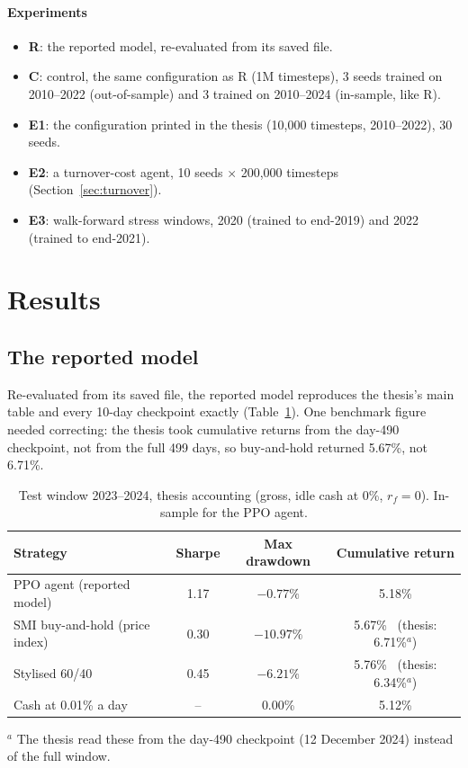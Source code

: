 \documentclass[11pt,a4paper]{article}
\begin{document}
\paragraph{Experiments}
\begin{itemize}[leftmargin=1.4em]
  \item \textbf{R}: the reported model, re-evaluated from its saved file.
  \item \textbf{C}: control, the same configuration as R (1M timesteps), 3 seeds trained on 2010--2022 (out-of-sample) and 3 trained on 2010--2024 (in-sample, like R).
  \item \textbf{E1}: the configuration printed in the thesis (10,000 timesteps, 2010--2022), 30 seeds.
  \item \textbf{E2}: a turnover-cost agent, 10 seeds $\times$ 200,000 timesteps (Section~\ref{sec:turnover}).
  \item \textbf{E3}: walk-forward stress windows, 2020 (trained to end-2019) and 2022 (trained to end-2021).
\end{itemize}

\section{Results}

\subsection{The reported model}\label{sec:reported}

Re-evaluated from its saved file, the reported model reproduces the thesis's main table and every 10-day checkpoint exactly (Table~\ref{tab:reported}). One benchmark figure needed correcting: the thesis took cumulative returns from the day-490 checkpoint, not from the full 499 days, so buy-and-hold returned 5.67\%, not 6.71\%.

\begin{table}[ht]
\centering\small
\caption{Test window 2023--2024, thesis accounting (gross, idle cash at 0\%, $r_f=0$). In-sample for the PPO agent.}
\label{tab:reported}
\begin{tabular}{@{}lccc@{}}
\toprule
\textbf{Strategy} & \textbf{Sharpe} & \textbf{Max drawdown} & \textbf{Cumulative return} \\
\midrule
PPO agent (reported model) & 1.17 & $-0.77\%$ & 5.18\% \\
SMI buy-and-hold (price index) & 0.30 & $-10.97\%$ & 5.67\% \ (thesis: 6.71\%$^{a}$) \\
Stylised 60/40 & 0.45 & $-6.21\%$ & 5.76\% \ (thesis: 6.34\%$^{a}$) \\
Cash at 0.01\% a day & -- & 0.00\% & 5.12\% \\
\bottomrule
\end{tabular}
\par\smallskip\footnotesize $^{a}$ The thesis read these from the day-490 checkpoint (12 December 2024) instead of the full window.
\end{table}
\end{document}
